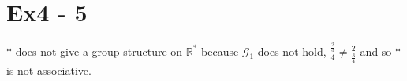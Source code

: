 \section*{Ex4 - 5}
$ * $ does not give a group structure on $ \mathbb{R}^* $ because $ \mathscr{G}_1 $ does not hold, $ \frac{\frac{2}{3}}{4} \ne \frac{2}{\frac{3}{4}} $ and so $ * $ is not associative.
